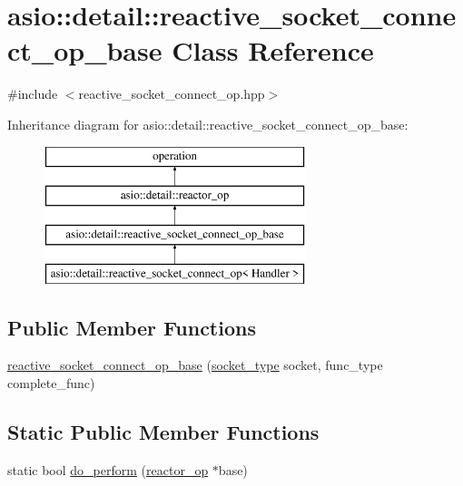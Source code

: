 \hypertarget{classasio_1_1detail_1_1reactive__socket__connect__op__base}{}\section{asio\+:\+:detail\+:\+:reactive\+\_\+socket\+\_\+connect\+\_\+op\+\_\+base Class Reference}
\label{classasio_1_1detail_1_1reactive__socket__connect__op__base}


{\ttfamily \#include $<$reactive\+\_\+socket\+\_\+connect\+\_\+op.\+hpp$>$}

Inheritance diagram for asio\+:\+:detail\+:\+:reactive\+\_\+socket\+\_\+connect\+\_\+op\+\_\+base\+:\begin{figure}[H]
\begin{center}
\leavevmode
\includegraphics[height=4.000000cm]{classasio_1_1detail_1_1reactive__socket__connect__op__base}
\end{center}
\end{figure}
\subsection*{Public Member Functions}
\begin{DoxyCompactItemize}
\item 
\hyperlink{classasio_1_1detail_1_1reactive__socket__connect__op__base_a0ceaaa674442426225725aa588f3f519}{reactive\+\_\+socket\+\_\+connect\+\_\+op\+\_\+base} (\hyperlink{namespaceasio_1_1detail_a6798c771dd84b79798b1a08150706ea9}{socket\+\_\+type} socket, func\+\_\+type complete\+\_\+func)
\end{DoxyCompactItemize}
\subsection*{Static Public Member Functions}
\begin{DoxyCompactItemize}
\item 
static bool \hyperlink{classasio_1_1detail_1_1reactive__socket__connect__op__base_ab812aa9b3569968bfe5361d7a1fbd9ae}{do\+\_\+perform} (\hyperlink{classasio_1_1detail_1_1reactor__op}{reactor\+\_\+op} $\ast$base)
\end{DoxyCompactItemize}
